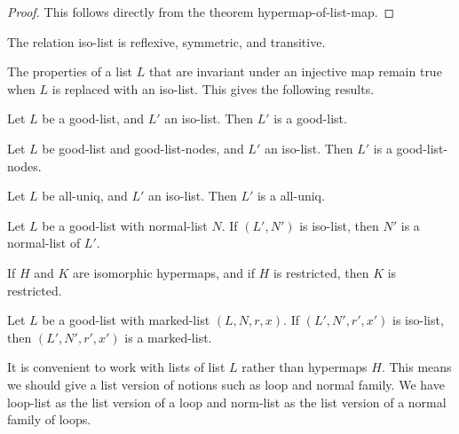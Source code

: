 \begin{proof} This follows directly from the theorem hypermap-of-list-map.
\end{proof}

\begin{lemma}  
The relation iso-list is reflexive, symmetric, and transitive.
\end{lemma}

The properties of a list $L$ that are invariant under an injective map remain true when $L$ is replaced
with an iso-list.  This gives the following results.

\begin{lemma}
Let $L$ be a good-list, and $L'$ an iso-list.  Then $L'$ is a good-list.
\end{lemma}

\begin{lemma}
Let $L$ be good-list and good-list-nodes, and $L'$ an iso-list.  Then $L'$ is a good-list-nodes.
\end{lemma}

\begin{lemma} 
Let $L$ be all-uniq, and $L'$ an iso-list.  Then $L'$ is a all-uniq.
\end{lemma}

\begin{lemma}
 Let $L$ be a good-list with normal-list $N$.  If $(L',N')$ is iso-list, then $N'$ is a normal-list of $L'$.
\end{lemma}

\begin{lemma}
If $H$ and $K$ are isomorphic hypermaps, and if $H$ is restricted, then $K$ is restricted.
\end{lemma}

\begin{lemma}
Let $L$ be a good-list with marked-list $(L,N,r,x)$.  If $(L',N',r',x')$ is iso-list, then $(L',N',r',x')$ is a marked-list.
\end{lemma}




It is convenient to work with lists of list $L$ rather than hypermaps $H$.  This means
we should give a list version of notions such as loop and normal family.
We have loop-list as the list version of a loop and norm-list as the list
version of  a normal family of loops.  




